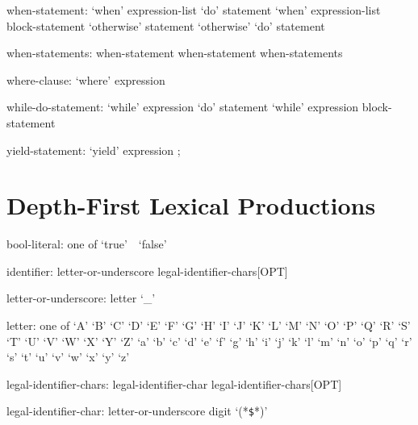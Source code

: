 \begin{syntax}
when-statement:
  `when' expression-list `do' statement
  `when' expression-list block-statement
  `otherwise' statement
  `otherwise' `do' statement
\end{syntax}

\begin{syntax}
when-statements:
  when-statement
  when-statement when-statements
\end{syntax}

\begin{syntax}
where-clause:
  `where' expression
\end{syntax}

\begin{syntax}
while-do-statement:
  `while' expression `do' statement
  `while' expression block-statement
\end{syntax}

\begin{syntax}
yield-statement:
  `yield' expression ;
\end{syntax}

\section{Depth-First Lexical Productions}

\begin{syntax}
bool-literal: one of
  `true' $ $ $ $ `false'
\end{syntax}

\begin{syntax}
identifier:
  letter-or-underscore legal-identifier-chars[OPT]
\end{syntax}

\begin{syntax}
letter-or-underscore:
  letter
  `_'
\end{syntax}

\begin{syntax}
letter: one of
  `A' `B' `C' `D' `E' `F' `G' `H' `I' `J' `K' `L' `M' `N' `O' `P' `Q' `R' `S' `T' `U' `V' `W' `X' `Y' `Z'
  `a' `b' `c' `d' `e' `f' `g' `h' `i' `j' `k' `l' `m' `n' `o' `p' `q' `r' `s' `t' `u' `v' `w' `x' `y' `z'
\end{syntax}

\begin{syntax}
legal-identifier-chars:
  legal-identifier-char legal-identifier-chars[OPT]
\end{syntax}

\begin{syntax}
legal-identifier-char:
  letter-or-underscore
  digit
  `(*\texttt{\$}*)'
\end{syntax}

